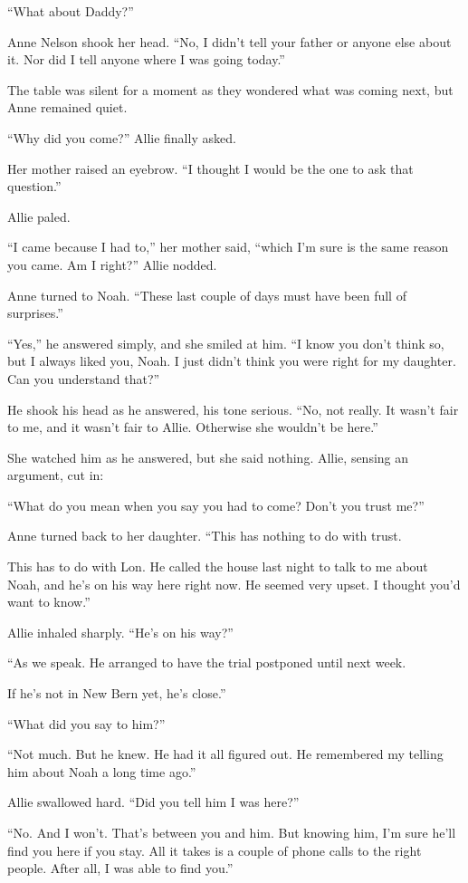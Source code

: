 \documentclass[10pt, twoside, openright]{book}
\begin{document}
``What about Daddy?''


Anne Nelson shook her head. ``No, I didn't tell your father or anyone
else about it. Nor did I tell anyone where I was going today.''

The table was silent for a moment as they wondered what was coming next,
but Anne remained quiet.


``Why did you come?'' Allie finally asked.


Her mother raised an eyebrow. ``I thought I would be the one to ask that
question.''


Allie paled.


``I came because I had to,'' her mother said, ``which I'm sure is the
same reason you came. Am I right?'' Allie nodded.

Anne turned to Noah. ``These last couple of days must have been full of
surprises.''

``Yes,'' he answered simply, and she smiled at him. ``I know you don't
think so, but I always liked you, Noah. I just didn't think you were
right for my daughter. Can you understand that?''

He shook his head as he answered, his tone serious. ``No, not really. It
wasn't fair to me, and it wasn't fair to Allie. Otherwise she wouldn't
be here.''

She watched him as he answered, but she said nothing. Allie, sensing an
argument, cut in:

``What do you mean when you say you had to come? Don't you trust me?''


Anne turned back to her daughter. ``This has nothing to do with trust.


This has to do with Lon. He called the house last night to talk to me
about Noah, and he's on his way here right now. He seemed very upset. I
thought you'd want to know.''


Allie inhaled sharply. ``He's on his way?''

``As we speak. He arranged to have the trial postponed until next week.


If he's not in New Bern yet, he's close.''


``What did you say to him?''


``Not much. But he knew. He had it all figured out. He remembered my
telling him about Noah a long time ago.''


Allie swallowed hard. ``Did you tell him I was here?''


``No. And I won't. That's between you and him. But knowing him, I'm sure
he'll find you here if you stay. All it takes is a couple of phone calls
to the right people. After all, I was able to find you.''
\end{document}
